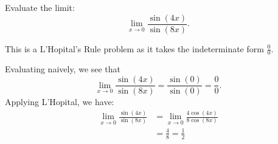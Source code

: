 \documentclass{ximera}
\author{Emma Smith Zbarsky}
\begin{document}
\begin{exercise}

Evaluate the limit: \[\lim_{x \to 0} \frac{\sin(4x)}{\sin(8x)}.\]


\begin{hint}
This is a L'Hopital's Rule problem as it takes the indeterminate form
$\frac{0}{0}$.
\end{hint}


\begin{hint}
Evaluating naively, we see that
\[\lim_{x\to 0} \frac{\sin(4x)}{\sin(8x)} = \frac{\sin(0)}{\sin(0)} = \frac{0}{0}.\]
Applying L'Hopital, we have: \begin{align*}
\lim_{x\to 0} \frac{\sin(4x)}{\sin(8x)} &= \lim_{x\to 0} \frac{4\cos(4x)}{8\cos(8x)} \\
&= \frac{4}{8} = \frac{1}{2}
\end{align*}
\end{hint}


\begin{multipleChoice}
\choice{$\infty$}
\end{multipleChoice}

\end{exercise}
\end{document}
